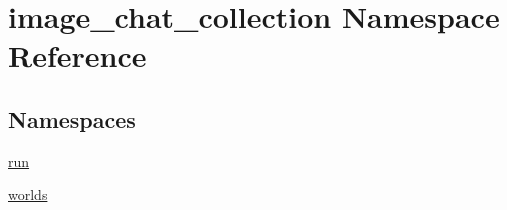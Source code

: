 \hypertarget{namespaceimage__chat__collection}{}\section{image\+\_\+chat\+\_\+collection Namespace Reference}
\label{namespaceimage__chat__collection}
\subsection*{Namespaces}
\begin{DoxyCompactItemize}
\item 
 \hyperlink{namespaceimage__chat__collection_1_1run}{run}
\item 
 \hyperlink{namespaceimage__chat__collection_1_1worlds}{worlds}
\end{DoxyCompactItemize}

